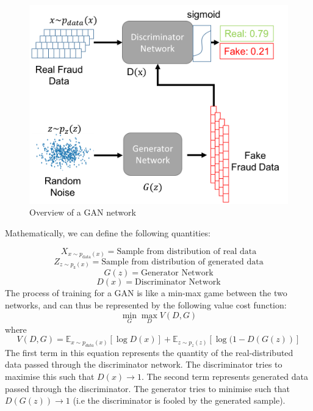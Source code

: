 \documentclass[12pt,a4paper,twoside]{report}
\begin{document}
\begin{figure}[!htbp]

\centering
\includegraphics[width=\textwidth]{GAN-Overview-withequations}
\caption{Overview of a GAN network}
\end{figure}

Mathematically, we can define the following quantities:

$$X_{x\sim p_\text{data}(x)} = \text{Sample from distribution of real data} $$
$$Z_{z\sim p_\text{z}(x)} = \text{Sample from distribution of generated data} $$
$$G(z) = \text{Generator Network}$$
$$D(x) = \text{Discriminator Network}$$
The process of training for a GAN is like a min-max game between the two networks, and can thus be represented by the following value cost function:
$$\min _ { G } \max _ { D } V ( D ,G )$$
where 
$$V ( D ,G ) = \mathbb { E } _ { x \sim p _ { d a t a } ( x ) } [ \log D ( x ) ] + \mathbb { E } _ { z \sim p _ { z } ( z ) }[ \log ( 1- D ( G ( z ) ) ] $$
The first term in this equation represents the quantity of the real-distributed data passed through the discriminator network. The discriminator tries to maximise this such that $D(x)\rightarrow 1$. The second term represents generated data passed through the discriminator. The generator tries to minimise such that $D(G(z))\rightarrow 1$ (i.e the discriminator is fooled by the generated sample).
\end{document}
